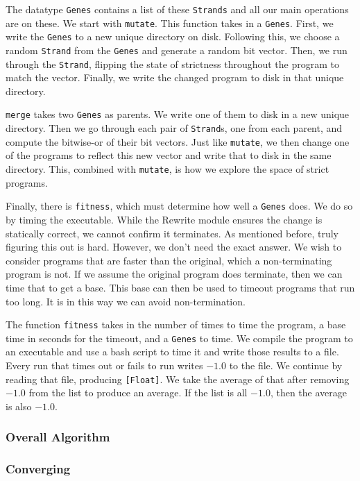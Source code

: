 \documentclass{sigplanconf}
\begin{document}
The datatype \lstinline!Genes! contains a list of these \lstinline!Strands! and all our main operations are on these. We start with \lstinline!mutate!. This function takes in a \lstinline!Genes!. First, we write the \lstinline!Genes! to a new unique directory on disk. Following this, we choose a random \lstinline!Strand! from the \lstinline!Genes! and generate a random bit vector. Then, we run through the \lstinline!Strand!, flipping the state of strictness throughout the program to match the vector. Finally, we write the changed program to disk in that unique directory.

\lstinline!merge! takes two \lstinline!Genes! as parents. We write one of them to disk in a new unique directory. Then we go through each pair of \lstinline!Strand!s, one from each parent, and compute the bitwise-or of their bit vectors. Just like \lstinline!mutate!, we then change one of the programs to reflect this new vector and write that to disk in the same directory. This, combined with \lstinline!mutate!, is how we explore the space of strict programs.

Finally, there is \lstinline!fitness!, which must determine how well a \lstinline!Genes! does. We do so by timing the executable. While the Rewrite module ensures the change is statically correct, we cannot confirm it terminates. As mentioned before, truly figuring this out is hard. However, we don't need the exact answer. We wish to consider programs that are faster than the original, which a non-terminating program is not. If we assume the original program does terminate, then we can time that to get a base. This base can then be used to timeout programs that run too long. It is in this way we can avoid non-termination.

The function \lstinline!fitness! takes in the number of times to time the program, a base time in seconds for the timeout, and a \lstinline!Genes! to time. We compile the program to an executable and use a bash script to time it and write those results to a file. Every run that times out or fails to run writes $-1.0$ to the file. We continue by reading that file, producing \lstinline![Float]!. We take the average of that after removing $-1.0$ from the list to produce an average. If the list is all $-1.0$, then the average is also $-1.0$.
\subsubsection{Overall Algorithm}

\subsubsection{Converging}
\end{document}
